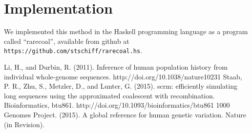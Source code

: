 \documentclass[a4paper]{article}
\begin{document}
\section{Implementation}

We implemented this method in the Haskell programming language as a program called ``rarecoal'', available from github at \texttt{https://github.com/stschiff/rarecoal.hs}.



\begin{thebibliography}{1}
	 Li, H., and Durbin, R. (2011). Inference of human population history from individual whole-genome sequences. http://doi.org/10.1038/nature10231
     Staab, P. R., Zhu, S., Metzler, D., and Lunter, G. (2015). scrm: efficiently simulating long sequences using the approximated coalescent with recombination. Bioinformatics, btu861. http://doi.org/10.1093/bioinformatics/btu861
     1000 Genomes Project. (2015). A global reference for human genetic variation. Nature (in Revision).
\end{thebibliography}
\end{document}
